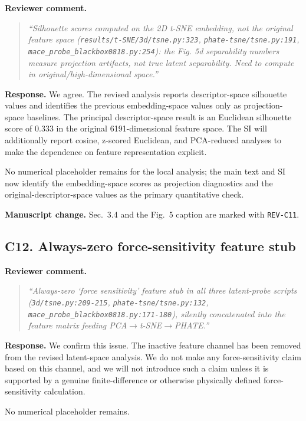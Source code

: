 \documentclass[11pt,a4paper]{article}
\begin{document}
\noindent\textbf{Reviewer comment.}
\begin{quote}
\itshape
``Silhouette scores computed on the 2D t-SNE embedding, not the original feature space (\texttt{results/t-SNE/3d/tsne.py:323}, \texttt{phate-tsne/tsne.py:191}, \texttt{mace\_probe\_blackbox0818.py:254}): the Fig. 5d separability numbers measure projection artifacts, not true latent separability. Need to compute in original/high-dimensional space.''
\end{quote}

\noindent\textbf{Response.}
We agree. The revised analysis reports descriptor-space silhouette values and identifies the previous embedding-space values only as projection-space baselines. The principal descriptor-space result is an Euclidean silhouette score of 0.333 in the original 6191-dimensional feature space. The SI will additionally report cosine, z-scored Euclidean, and PCA-reduced analyses to make the dependence on feature representation explicit.

No numerical placeholder remains for the local analysis; the main text and SI now identify the embedding-space scores as projection diagnostics and the original-descriptor-space values as the primary quantitative check.

\noindent\textbf{Manuscript change.}
Sec.~3.4 and the Fig.~5 caption are marked with \texttt{REV-C11}.

\subsection*{C12. Always-zero force-sensitivity feature stub}

\noindent\textbf{Reviewer comment.}
\begin{quote}
\itshape
``Always-zero `force sensitivity' feature stub in all three latent-probe scripts (\texttt{3d/tsne.py:209-215}, \texttt{phate-tsne/tsne.py:132}, \texttt{mace\_probe\_blackbox0818.py:171-180}), silently concatenated into the feature matrix feeding PCA$\rightarrow$t-SNE$\rightarrow$PHATE.''
\end{quote}

\noindent\textbf{Response.}
We confirm this issue. The inactive feature channel has been removed from the revised latent-space analysis. We do not make any force-sensitivity claim based on this channel, and we will not introduce such a claim unless it is supported by a genuine finite-difference or otherwise physically defined force-sensitivity calculation.

No numerical placeholder remains.
\end{document}
